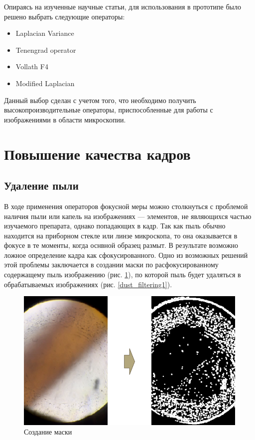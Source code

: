 \documentclass[14pt]{matmex-diploma-custom}
\begin{document}
Опираясь на изученные научные статьи, для использования в прототипе было решено выбрать следующие операторы:
\begin{itemize}
    \item Laplacian Variance 
    \item Tenengrad operator
    \item Vollath F4
    \item Modified Laplacian
\end{itemize}
Данный выбор сделан с учетом того, что необходимо получить высокопроизводительные операторы, приспособленные для работы с изображениями в области микроскопии.

\section{Повышение качества кадров}
\subsection{Удаление пыли}

В ходе применения операторов фокусной меры можно столкнуться с проблемой наличия пыли или капель на изображениях --- элементов, не являющихся частью изучаемого препарата, однако попадающих в кадр. Так как пыль обычно находится на приборном стекле или линзе микроскопа, то она оказывается в фокусе в те моменты, когда оснвной образец размыт. В результате возможно ложное определение кадра как сфокусированного. Одно из возможных решений этой проблемы заключается в создании  маски по расфокусированному содержащему пыль изображению (рис. \ref{dust_map1}), по которой пыль будет удаляться в обрабатываемых изображениях (рис. \ref{dust_filtering1}).

\begin{figure}[h]
\centering
\includegraphics[width=1.0\textwidth]{figures/dust1.png}
\caption{Создание маски}
\label{dust_map1}
\end{figure}
\end{document}
